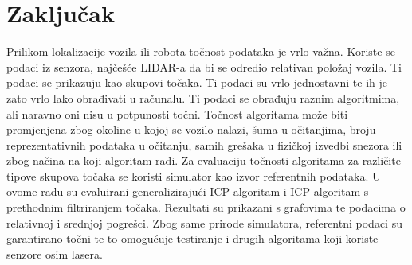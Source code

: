 \chapter{Zaključak}
Prilikom lokalizacije vozila ili robota točnost podataka je vrlo važna. Koriste se podaci iz senzora, najčešće LIDAR-a da bi se odredio relativan položaj vozila. Ti podaci se prikazuju kao skupovi točaka. Ti podaci su vrlo jednostavni te ih je zato vrlo lako obrađivati u računalu. Ti podaci se obrađuju raznim algoritmima, ali naravno oni nisu u potpunosti točni. Točnost algoritama može biti promjenjena zbog okoline u kojoj se vozilo nalazi, šuma u očitanjima, broju reprezentativnih podataka u očitanju, samih grešaka u fizičkoj izvedbi snezora ili zbog načina na koji algoritam radi. Za evaluaciju točnosti algoritama za različite tipove skupova točaka se koristi simulator kao izvor referentnih podataka. U ovome radu su evaluirani generalizirajući ICP algoritam i ICP algoritam s prethodnim filtriranjem točaka. Rezultati su prikazani s grafovima te podacima o relativnoj i srednjoj pogrešci. Zbog same prirode simulatora, referentni podaci su garantirano točni te to omogućuje testiranje i drugih algoritama koji koriste senzore osim lasera.